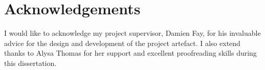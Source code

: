 \chapter*{Acknowledgements}
I would like to acknowledge my project supervisor, Damien Fay, for his invaluable advice for the design and development of the project artefact.
I also extend thanks to Alysa Thomas for her support and excellent proofreading skills during this dissertation.
